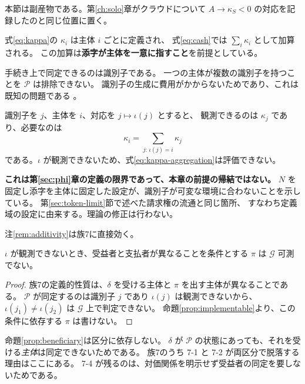 本節は副産物である。第\ref{ch:solo}章がクラウドについて
$A\to\kappa_S<0$ の対応を記録したのと同じ位置に置く。

式\eqref{eq:kappa}の $\kappa_i$ は主体 $i$ ごとに定義され、
式\eqref{eq:cash}では $\sum_i\kappa_i$ として加算される。
この加算は\textbf{添字が主体を一意に指すこと}を前提としている。

手続き上で同定できるのは識別子である。
一つの主体が複数の識別子を持つことを $\mathcal{P}$ は排除できない。
識別子の生成に費用がかからないためであり、これは既知の問題である \cite{douceur2002}。

\begin{remark}[加法性の喪失]
\label{rem:additivity}
識別子を $j$、主体を $i$、対応を $j\mapsto\iota(j)$ とすると、
観測できるのは $\kappa_j$ であり、必要なのは
\begin{equation}
\kappa_i = \sum_{j:\,\iota(j)=i} \kappa_j
\label{eq:kappa-aggregation}
\end{equation}
である。$\iota$ が観測できないため、式\eqref{eq:kappa-aggregation}は評価できない。

\textbf{これは第\ref{sec:phi}章の定義の限界であって、本章の前提の帰結ではない。}
$N$ を固定し添字を主体に固定した設定が、識別子が可変な環境に合わないことを示している。
第\ref{sec:token-limit}節で述べた請求権の流通と同じ箇所、
すなわち定義域の設定に由来する。理論の修正は行わない。
\end{remark}

注\ref{rem:additivity}は族7に直接効く。

\begin{proposition}
\label{prop:beneficiary}
$\iota$ が観測できないとき、受益者と支払者が異なることを条件とする $\pi$ は
$\mathcal{G}$ 可測でない。
\end{proposition}

\begin{proof}
族7の定義的性質は、$\delta$ を受ける主体と $\pi$ を出す主体が異なることである。
$\mathcal{P}$ が同定するのは識別子 $j$ であり $\iota(j)$ は観測できないから、
$\iota(j_1)\neq\iota(j_2)$ は $\mathcal{G}$ 上で判定できない。
命題\ref{prop:implementable}より、この条件に依存する $\pi$ は書けない。
\end{proof}

命題\ref{prop:beneficiary}は区分に依存しない。
$\delta$ が $\mathcal{P}$ の状態にあっても、それを受ける\emph{主体}は同定できないためである。
族7のうち 7-1 と 7-2 が両区分で脱落する理由はここにある。
7-4 が残るのは、対価関係を明示せず受益者の同定を要しないためである。

